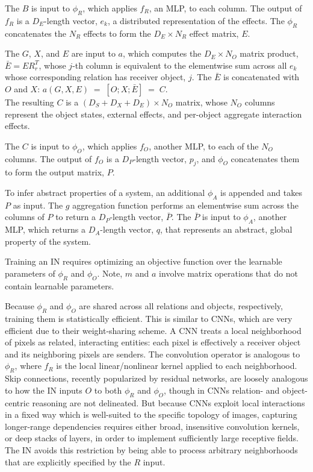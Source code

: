\documentclass{article}
\newcommand{\DS}{D_S}
\newcommand{\DX}{D_X}
\newcommand{\NO}{N_O}
\newcommand{\NR}{N_R}
\newcommand{\DE}{D_E}
\newcommand{\DP}{D_P}
\newcommand{\DA}{D_A}
\begin{document}
The $B$ is input to $\phi_R$, which applies $f_R$, an MLP, to each
column. The output of $f_R$ is a $\DE$-length vector, $e_k$, a
distributed representation of the effects. The $\phi_R$ concatenates
the $\NR$ effects to form the $\DE \times \NR$ effect matrix, $E$.

The $G$, $X$, and $E$ are input to $a$, which computes the $\DE \times
\NO$ matrix product, $\bar{E} = E R_r^T$, whose $j$-th column is
equivalent to the elementwise sum across all $e_k$ whose corresponding
relation has receiver object, $j$. The $\bar{E}$ is concatenated with
$O$ and $X$: \quad $a(G, X, E) \; = \; [ O ; X; \bar{E}] \; = \; C$. \\
The resulting $C$ is a $(\DS + \DX + \DE) \times \NO$ matrix, whose
$\NO$ columns represent the object states, external effects, and
per-object aggregate interaction effects.

The $C$ is input to $\phi_O$, which applies $f_O$, another MLP, to
each of the $\NO$ columns. The output of $f_O$ is a $\DP$-length
vector, $p_j$, and $\phi_O$ concatenates them to form the output
matrix, $P$.

To infer abstract properties of a system, an additional $\phi_A$ is
appended and takes $P$ as input. The $g$ aggregation function performs
an elementwise sum across the columns of $P$ to return a $\DP$-length
vector, $\bar{P}$. The $\bar{P}$ is input to $\phi_A$, another MLP,
which returns a $\DA$-length vector, $q$, that represents an abstract,
global property of the system.

Training an IN requires optimizing an objective function over the
learnable parameters of $\phi_R$ and $\phi_O$. Note, $m$ and $a$
involve matrix operations that do not contain learnable parameters.

Because $\phi_R$ and $\phi_O$ are shared across all relations and
objects, respectively, training them is statistically efficient. This
is similar to CNNs, which are very efficient due to their
weight-sharing scheme. A CNN treats a local neighborhood of pixels as
related, interacting entities: each pixel is effectively a receiver
object and its neighboring pixels are senders. The convolution
operator is analogous to $\phi_R$, where $f_R$ is the local
linear/nonlinear kernel applied to each neighborhood. Skip
connections, recently popularized by residual networks, are loosely
analogous to how the IN inputs $O$ to both $\phi_R$ and $\phi_O$,
though in CNNs relation- and object-centric reasoning are not
delineated. But because CNNs exploit local interactions in a fixed way
which is well-suited to the specific topology of images, capturing
longer-range dependencies requires either broad, insensitive
convolution kernels, or deep stacks of layers, in order to implement
sufficiently large receptive fields. The IN avoids this restriction by
being able to process arbitrary neighborhoods that are explicitly
specified by the $R$ input.
\end{document}

